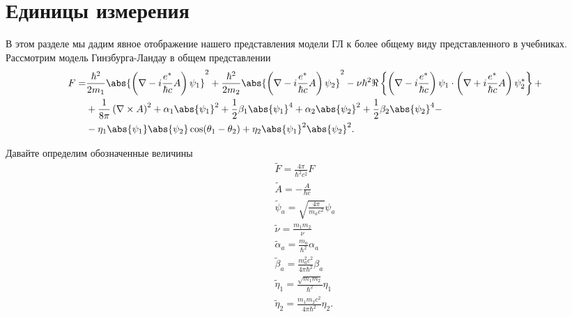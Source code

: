 \chapter{Единицы измерения}
\label{ch:A}

В этом разделе мы дадим явное отображение нашего представления модели
ГЛ к более общему виду представленного в учебниках. Рассмотрим модель
Гинзбурга-Ландау в общем представлении
\begin{align}
	F = & \frac{\hbar^2}{2m_1} \abs{\left( \nabla - i\frac{e^*}{\hbar c} A\right)
	  \psi_1}^2 + \frac{\hbar^2}{2m_2} \abs{\left( \nabla - i\frac{e^*}{\hbar c}A
	  \right) \psi_2}^2 - \nu\hbar^2 \Re\left\{ \left( \nabla - i\frac{e^*}{\hbar c}
	  \right)\psi_1  \cdot \left( \nabla + i\frac{e^*}{\hbar c}A \right)
	  \psi^*_2\right\} + \nonumber \\
  & + \frac{1}{8\pi}\left( \nabla\times A \right)^2 + \alpha_1\abs{\psi_1}^2 +
		\frac{1}{2}\beta_1\abs{\psi_1}^4 + \alpha_2\abs{\psi_2}^2 + \frac{1}{2}
		\beta_2\abs{\psi_2}^4 - \nonumber \\
	& - \eta_1\abs{\psi_1}\abs{\psi_2} \cos(\theta_1 - \theta_2) +
		\eta_2\abs{\psi_1}^2\abs{\psi_2}^2. \label{eq:A-1}
\end{align}

Давайте определим обозначенные величины
\begin{gather}
	\tilde{F} = \frac{4\pi}{\hbar^2 c^2}F \nonumber \\
	\tilde{A} = -\frac{A}{\hbar c} \nonumber \\
	\tilde{\psi}_a = \sqrt{\frac{4\pi}{m_a c^2}}\psi_a \nonumber \\
	\tilde{\nu} = \frac{m_1m_2}\nu \nonumber \\
	\tilde{\alpha}_a = \frac{m_a}{\hbar^2}\alpha_a \nonumber \\
	\tilde{\beta}_a = \frac{m^2_a c^2}{4\pi\hbar^2}\beta_a \nonumber \\
	\tilde{\eta}_1 = \frac{\sqrt{m_1 m_2}}{\hbar^2}\eta_1 \nonumber \\
	\tilde{\eta}_2 = \frac{m_1 m_2 c^2}{4\pi\hbar^2}\eta_2. \label{eq:A-2}
\end{gather}

